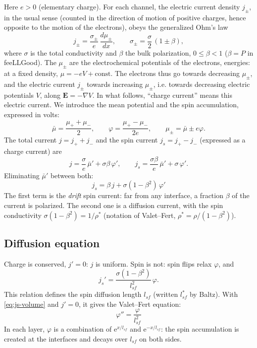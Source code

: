 \documentclass[11pt,a4paper]{article}
\newcommand{\ee}{\mathrm{e}}
\begin{document}
Here $e>0$ (elementary charge). For each channel, the electric current
density $j_\pm$, in the usual sense (counted in the direction of motion of
positive charges, hence opposite to the motion of the electrons), obeys the
generalized Ohm's law
\begin{equation}
  j_\pm = \frac{\sigma_\pm}{e}\,\frac{d\mu_\pm}{dx},
  \qquad
  \sigma_\pm = \frac{\sigma}{2}\,(1\pm\beta),
  \label{eq:ohm}
\end{equation}
where $\sigma$ is the total conductivity and $\beta$ the bulk
polarization, $0\le\beta<1$ ($\beta = P$ in feeLLGood). The $\mu_\pm$ are
the electrochemical potentials of the electrons, energies: at a fixed
density, $\mu = -eV + \text{const}$. The electrons thus go towards
decreasing $\mu_\pm$, and the electric current $j_\pm$ towards increasing
$\mu_\pm$, i.e. towards decreasing electric potentials $V$, along
$\bm{E} = -\nabla V$. In what follows, ``charge current'' means this electric
current. We introduce the mean potential and the spin accumulation,
expressed in volts:
\begin{equation}
  \bar\mu = \frac{\mu_++\mu_-}{2},
  \qquad
  \varphi = \frac{\mu_+-\mu_-}{2e},
  \qquad
  \mu_\pm = \bar\mu \pm e\varphi .
\end{equation}
The total current $j = j_++j_-$ and the spin current $j_s = j_+-j_-$
(expressed as a charge current) are
\begin{equation}
  j = \frac{\sigma}{e}\,\bar\mu' + \sigma\beta\,\varphi',
  \qquad
  j_s = \frac{\sigma\beta}{e}\,\bar\mu' + \sigma\,\varphi' .
\end{equation}
Eliminating $\bar\mu'$ between both:
\begin{equation}
  \boxed{\;j_s = \beta\,j + \sigma(1-\beta^2)\,\varphi'\;}
  \label{eq:js-volume}
\end{equation}
The first term is the \emph{drift} spin current: far from any interface, a
fraction $\beta$ of the current is polarized. The second one is a
diffusion current, with the spin conductivity $\sigma(1-\beta^2) =
1/\rho^*$ (notation of Valet--Fert, $\rho^* = \rho/(1-\beta^2)$).

\subsection{Diffusion equation}

Charge is conserved, $j' = 0$: $j$ is uniform. Spin is not: spin flips
relax $\varphi$, and
\begin{equation}
  j_s' = \frac{\sigma(1-\beta^2)}{l_{sf}^2}\,\varphi .
\end{equation}
This relation defines the spin diffusion length $l_{sf}$ (written
$l_{sf}^*$ by Baltz).
With \eqref{eq:js-volume} and $j' = 0$, it gives the Valet--Fert equation:
\begin{equation}
  \boxed{\;\varphi'' = \frac{\varphi}{l_{sf}^2}\;}
  \label{eq:diffusion}
\end{equation}
In each layer, $\varphi$ is a combination of $\ee^{x/l_{sf}}$ and
$\ee^{-x/l_{sf}}$: the spin accumulation is created at the interfaces and
decays over $l_{sf}$ on both sides.
\end{document}
